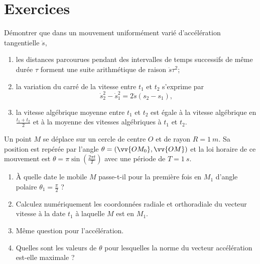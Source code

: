 \section{Exercices}
\label{chap1-sec:exercices}
\begin{exercice}
  Démontrer que dans un mouvement uniformément varié d'accélération tangentielle \(\ddot{s}\),
  \begin{enumerate}
  \item les distances parcourues pendant des intervalles de temps successifs de même durée \(\tau\) forment une suite arithmétique de raison \(\ddot{s}\tau^2\);
  \item la variation du carré de la vitesse entre \(t_1\) et \(t_2\) s'exprime par
    \begin{equation}
      \dot{s}_2^2-\dot{s}_1^2 = 2 \ddot{s}(s_2-s_1),
    \end{equation}
  \item la vitesse algébrique moyenne entre \(t_1\) et \(t_2\) est égale à la vitesse algébrique en \(\frac{t_1+t_2}{2}\) et à la moyenne des vitesses algébriques à \(t_1\) et \(t_2\).
  \end{enumerate}
\end{exercice}
%
\begin{exercice}
  Un point \(M\) se déplace sur un cercle de centre \(O\) et de rayon \(R=\SI{1}{m}\). Sa position est repérée par l'angle \(\theta=(\vv{OM_0},\vv{OM})\) et la loi horaire de ce mouvement est \(\theta=\pi\sin\left(\frac{2\pi t}{T}\right)\) avec une période de \(T=\SI{1}{s}\).
  \begin{enumerate}
  \item À quelle date le mobile \(M\) passe-t-il pour la première fois en \(M_1\) d'angle polaire \(\theta_1=\frac{\pi}{2}\) ?
  \item Calculez numériquement les coordonnées radiale et orthoradiale du vecteur vitesse à la date \(t_1\) à laquelle \(M\) est en \(M_1\).
  \item Même question pour l'accélération.
  \item Quelles sont les valeurs de \(\theta\) pour lesquelles la norme du vecteur accélération est-elle maximale ?
  \end{enumerate}
\end{exercice}
%
